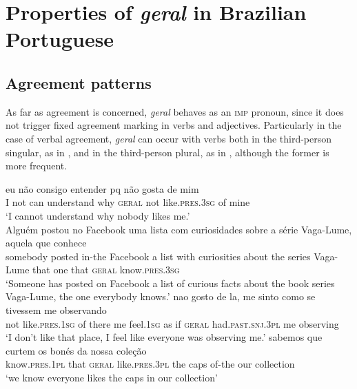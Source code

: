 \documentclass[output=paper]{langscibook}
\begin{document}
\section{{Properties} {of} \textit{geral} {in} {Brazilian} Portuguese}\label{sec:avelar:4}
 \subsection{Agreement patterns}\label{sec:avelar:4.1}

{As far as agreement is concerned,} \textit{geral} {behaves as an \textsc{imp} pronoun, since it does not trigger fixed agreement marking in verbs and adjectives. Particularly in the case of verbal agreement,} \textit{geral} {can occur with verbs both in the third-person singular, as in , and in the third-person plural, as in , although the former is more frequent.}


\ea\label{ex:avelar:19}
 \ea\label{ex:avelar:19a} 
  \gll eu   não  consigo   entender pq  não   gosta de mim\\
         I   not   can     understand why   \textsc{geral} not like.\textsc{pres.3sg} of mine \\
  \glt ‘I cannot understand why nobody likes me.’ \\
 \ex\label{ex:avelar:19b}
  \gll Alguém   postou  no Facebook     uma  lista   com  curiosidades sobre a   série Vaga-Lume, aquela   que {} {conhece}\\
         somebody  posted  in-the Facebook   a     list   with   curiosities about the   series Vaga-Lume {that one}   that \textsc{geral} know.\textsc{pres.3sg}\\
  \glt ‘Someone has posted on Facebook a list of curious facts about the book series Vaga-Lume, the one everybody knows.’
\z 
\ex\label{ex:avelar:20}
 \ea\label{ex:avelar:20a} 
  \gll nao   gosto         de la,     me  sinto     como   se  tivessem         me     observando \\ %
         {not   like.\textsc{pres.1sg} of there   me  feel.\textsc{1sg} as     if \textsc{geral} had.\textsc{past.snj.3pl} me    observing}\\
  \glt ‘I don’t like that place, I feel like everyone was observing me.’
 \ex\label{ex:avelar:20b}
  \gll sabemos       que  curtem os bonés da     nossa   coleção\\ %
         know.\textsc{pres.1pl} that \textsc{geral} like.\textsc{pres.3pl} the caps of-the   our   collection\\
\glt ‘we know everyone likes the caps in our collection’
\z 
\z
\end{document}
